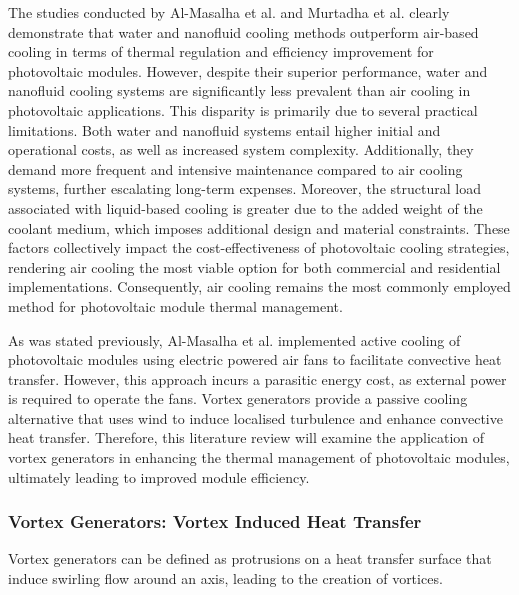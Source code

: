 The studies conducted by Al-Masalha et al. \cite{Al-Masalha2024ImprovingSystems} and Murtadha et al. \cite{Murtadha2022ImprovingNanofluid} clearly demonstrate that water and nanofluid cooling methods outperform air-based cooling in terms of thermal regulation and efficiency improvement for photovoltaic modules. However, despite their superior performance, water and nanofluid cooling systems are significantly less prevalent than air cooling in photovoltaic applications. This disparity is primarily due to several practical limitations. Both water and nanofluid systems entail higher initial and operational costs, as well as increased system complexity. \cite{Dwivedi2020AdvancedArt, Suresh2018RoleEfficiency} Additionally, they demand more frequent and intensive maintenance compared to air cooling systems, further escalating long-term expenses. \cite{Samykano2023HybridApplications, Ponticorvo2022FoulingFluid} Moreover, the structural load associated with liquid-based cooling is greater due to the added weight of the coolant medium, which imposes additional design and material constraints. \cite{Sakanova2016InvestigationAircraft} These factors collectively impact the cost-effectiveness of photovoltaic cooling strategies, rendering air cooling the most viable option for both commercial and residential implementations. Consequently, air cooling remains the most commonly employed method for photovoltaic module thermal management. \cite{Dwivedi2020AdvancedArt} \vspace{0.5em}

As was stated previously, Al-Masalha et al. implemented active cooling of photovoltaic modules using electric powered air fans to facilitate convective heat transfer. \cite{Al-Masalha2024ImprovingSystems} However, this approach incurs a parasitic energy cost, as external power is required to operate the fans. Vortex generators provide a passive cooling alternative that uses wind to induce localised turbulence and enhance convective heat transfer. Therefore, this literature review will examine the application of vortex generators in enhancing the thermal management of photovoltaic modules, ultimately leading to improved module efficiency.

\subsubsection{Vortex Generators: Vortex Induced Heat Transfer}
Vortex generators can be defined as protrusions on a heat transfer surface that induce swirling flow around an axis, leading to the creation of vortices. \cite{Awais2018HeatActivities}\vspace{0.5em}

